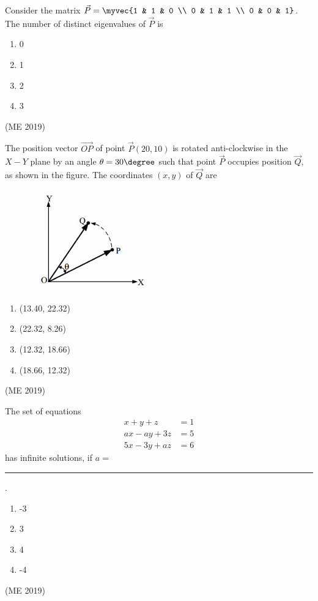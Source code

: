 \item Consider the matrix
$\vec{P} = \myvec{1 & 1 & 0 \\
                  0 & 1 & 1 \\
                  0 & 0 & 1} $.
The number of distinct eigenvalues of $ \vec{P} $ is
\begin{multicols}{4}
\begin{enumerate}
    \item 0
    \item 1
    \item 2
    \item 3
\end{enumerate}
\end{multicols}
\hfill (ME 2019)
\item The position vector $\overrightarrow{OP}$ of point $\vec{P}(20, 10)$ is rotated anti-clockwise in the $X-Y$ plane by an angle $\theta = 30\degree$ such that point $\vec{P}$ occupies position $\vec{Q}$, as shown in the figure. The coordinates $(x, y)$ of $\vec{Q}$ are
\begin{figure}[H]
\centering
\includegraphics[width=0.5\textwidth]{GATE/2019/ME/figs/Fig 5.png}
\caption{}
\label{fig:question16}
\end{figure}
\begin{multicols}{4}
\begin{enumerate}
\item (13.40, 22.32) 
\item (22.32, 8.26)  
\item (12.32, 18.66)  
\item (18.66, 12.32)  
\end{enumerate}
\end{multicols}
\hfill (ME 2019)
\item The set of equations
\begin{align*}
x + y + z &= 1 \\
ax - ay + 3z &= 5 \\
5x - 3y + az &= 6
\end{align*}
has infinite solutions, if $ a =$\rule{1cm}{0.01pt}.
\begin{multicols}{4}
\begin{enumerate}
    \item -3
    \item 3
    \item 4
    \item -4
\end{enumerate}
\end{multicols}
\hfill (ME 2019)

